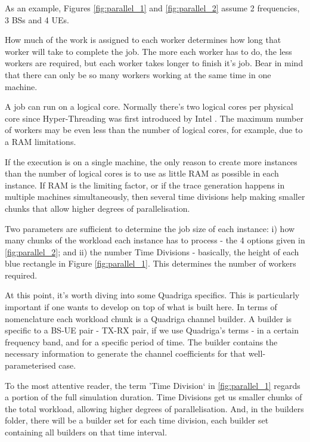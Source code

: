 As an example, Figures \ref{fig:parallel_1} and \ref{fig:parallel_2} assume 2 frequencies, 3 \acsp{BS} and 4 \acsp{UE}.

How much of the work is assigned to each worker determines how long that worker will take to complete the job. 
The more each worker has to do, the less workers are required, but each worker takes longer to finish it's job. Bear in mind that there can only be so many workers working at the same time in one machine.

A job can run on a logical core. Normally there's two logical cores per physical core since Hyper-Threading was first introduced by Intel \cite{wiki:hyperthreading}. The maximum number of workers may be even less than the number of logical cores, for example, due to a \acs{RAM} limitations.

If the execution is on a single machine, the only reason to create more instances than the number of logical cores is to use as little \acs{RAM} as possible in each instance. If \acs{RAM} is the limiting factor, or if the trace generation happens in multiple machines simultaneously, then several time divisions help making smaller chunks that allow higher degrees of parallelisation.

Two parameters are sufficient to determine the job size of each instance: i) how many chunks of the workload each instance has to process - the 4 options given in \ref{fig:parallel_2}; and ii) the number Time Divisions - basically, the height of each blue rectangle in Figure \ref{fig:parallel_1}. This determines the number of workers required.

At this point, it's worth diving into some Quadriga specifics. This is particularly important if one wants to develop on top of what is built here. In terms of nomenclature each workload chunk is a Quadriga channel builder. A builder is specific to a \acs{BS}-\acs{UE} pair - \acs{TX}-\acs{RX} pair, if we use Quadriga's terms - in a certain frequency band, and for a specific period of time. The builder contains the necessary information to generate the channel coefficients for that well-parameterised case.

To the most attentive reader, the term 'Time Division` in \ref{fig:parallel_1} regards a portion of the full simulation duration. Time Divisions get us smaller chunks of the total workload, allowing higher degrees of parallelisation. And, in the builders folder, there will be a builder set for each time division, each builder set containing all builders on that time interval.

